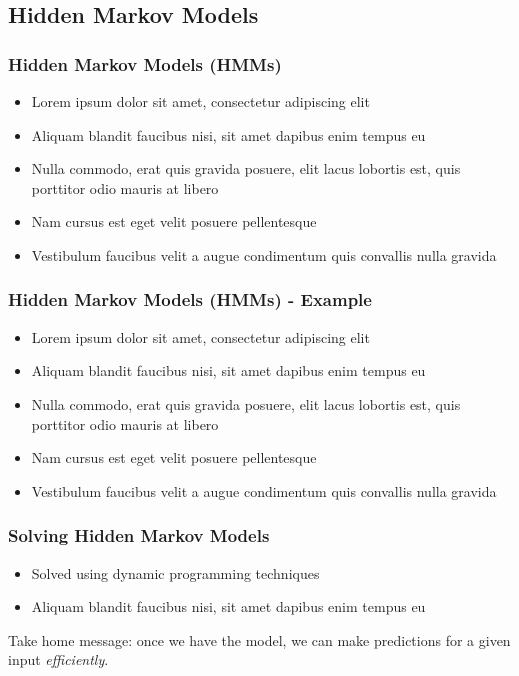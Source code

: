 \documentclass{beamer}
\begin{document}
\subsection{Hidden Markov Models}
\begin{frame}
\frametitle{Hidden Markov Models (HMMs)}
\begin{itemize}
\item Lorem ipsum dolor sit amet, consectetur adipiscing elit
\item Aliquam blandit faucibus nisi, sit amet dapibus enim tempus eu
\item Nulla commodo, erat quis gravida posuere, elit lacus lobortis est, quis porttitor odio mauris at libero
\item Nam cursus est eget velit posuere pellentesque
\item Vestibulum faucibus velit a augue condimentum quis convallis nulla gravida
\end{itemize}
\end{frame}


\begin{frame}
\frametitle{Hidden Markov Models (HMMs) - Example}
\begin{itemize}
\item Lorem ipsum dolor sit amet, consectetur adipiscing elit
\item Aliquam blandit faucibus nisi, sit amet dapibus enim tempus eu
\item Nulla commodo, erat quis gravida posuere, elit lacus lobortis est, quis porttitor odio mauris at libero
\item Nam cursus est eget velit posuere pellentesque
\item Vestibulum faucibus velit a augue condimentum quis convallis nulla gravida
\end{itemize}
\end{frame}


\begin{frame}
\frametitle{Solving Hidden Markov Models}
\begin{itemize}
\item Solved using dynamic programming techniques
\item Aliquam blandit faucibus nisi, sit amet dapibus enim tempus eu
\end{itemize}

Take home message: once we have the model, we can make predictions for a given input \emph{efficiently}.

\end{frame}
\end{document}
